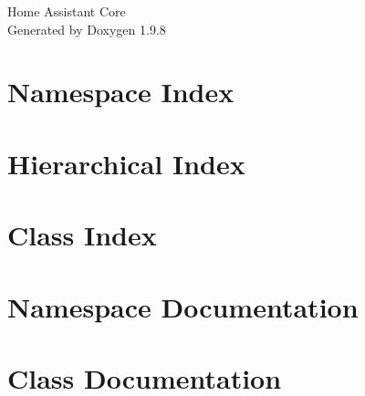 \documentclass[twoside]{book}
\newcommand{\+}{\discretionary{\mbox{\scriptsize$\hookleftarrow$}}{}{}}
\newcommand{\clearemptydoublepage}{%
    \newpage{\pagestyle{empty}\cleardoublepage}%
  }
\begin{document}
  \raggedbottom
    \hypersetup{pageanchor=false,
                bookmarksnumbered=true,
                pdfencoding=unicode
               }
  \begin{titlepage}
  \vspace*{7cm}
  \begin{center}%
  {\Large Home Assistant Core}\\
  \vspace*{1cm}
  {\large Generated by Doxygen 1.9.8}\\
  \end{center}
  \end{titlepage}
  \clearemptydoublepage
  \tableofcontents
  \clearemptydoublepage
  \hypersetup{pageanchor=true}
\chapter{Namespace Index}

\chapter{Hierarchical Index}

\chapter{Class Index}

\chapter{Namespace Documentation}







\chapter{Class Documentation}








  \backmatter
  \newpage
  \clearemptydoublepage
  \printindex
\end{document}
